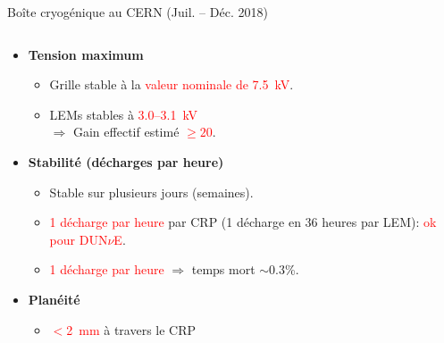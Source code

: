 \begin{frame}{Boîte cryogénique au CERN (Juil. -- Déc. 2018)}
\begin{columns}
\begin{column}{0.6\textwidth}
\begin{scriptsize}
	    			\begin{itemize}
	    				\item \textbf{Tension maximum}
	    				\begin{itemize}
	    					\item Grille stable à la \textcolor{red}{valeur nominale de \SI{7.5}{\kilo\volt}}.
	    					\item LEMs stables à \textcolor{red}{3.0--\SI{3.1}{\kilo\volt}}\\
				    					$\Rightarrow$ Gain effectif estimé \textcolor{red}{$\geq 20$}.
	    				\end{itemize}
	    				\item \textbf{Stabilité (décharges par heure)}
	    				\begin{itemize}
	    					\item Stable sur plusieurs jours (semaines).
	    					\item \textcolor{red}{1 décharge par heure} par CRP (1 décharge en 36 heures par LEM): \textcolor{red}{ok pour DUN$\nu$E}.
	    					\item \textcolor{red}{1 décharge par heure} $\Rightarrow$ temps mort $\sim$0.3\%.
	    				\end{itemize}
	    				\item \textbf{Planéité}
	    				\begin{itemize}
	    					\item \textcolor{red}{$<$\SI{2}{\milli\meter}} à travers le CRP %
	    				\end{itemize}
	    			\end{itemize}
	    		\end{scriptsize}
    		\end{column}
    	\end{columns}
	    \end{frame}

